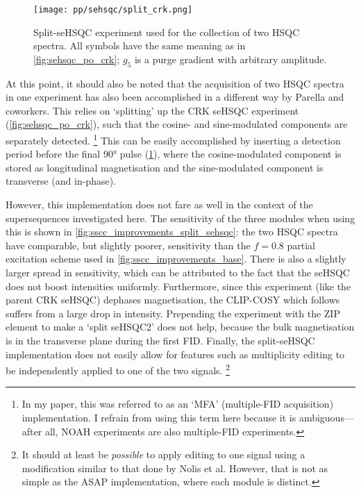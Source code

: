 \begin{figure}[!ht]
    \centering
    \texttt{[image: pp/sehsqc/split\_crk.png]}%
    \caption[Split-seHSQC experiment]{
        Split-seHSQC experiment used for the collection of two HSQC spectra.\autocite{Nolis2019CPC}
        All symbols have the same meaning as in \cref{fig:sehsqc_po_crk}; $g_5$ is a purge gradient with arbitrary amplitude.
    }
    \label{fig:split_crk}
\end{figure}

At this point, it should also be noted that the acquisition of two HSQC spectra in one experiment has also been accomplished in a different way by Parella and coworkers\autocite{Nolis2019CPC,Nolis2019JMR}.
This relies on `splitting' up the CRK seHSQC experiment (\cref{fig:sehsqc_po_crk}), such that the cosine- and sine-modulated components are separately detected.%
\footnote{In my paper\autocite{Yong2021JMR}, this was referred to as an `MFA' (multiple-FID acquisition) implementation. I refrain from using this term here because it is ambiguous---after all, NOAH experiments are also multiple-FID experiments.}
This can be easily accomplished by inserting a detection period before the final \proton{} \ang{90} pulse (\cref{fig:split_crk}), where the cosine-modulated component is stored as longitudinal magnetisation and the sine-modulated component is transverse (and in-phase).

However, this implementation does not fare as well in the context of the  supersequences investigated here.
The sensitivity of the three modules when using this is shown in \cref{fig:sscc_improvements_split_sehsqc}: the two HSQC spectra have comparable, but slightly poorer, sensitivity than the $f = 0.8$ partial excitation scheme used in \cref{fig:sscc_improvements_base}.
There is also a slightly larger spread in sensitivity, which can be attributed to the fact that the seHSQC does not boost intensities uniformly.
Furthermore, since this experiment (like the parent CRK seHSQC) dephases  magnetisation, the CLIP-COSY which follows suffers from a large drop in intensity.
Prepending the experiment with the ZIP element to make a `split seHSQC2' does not help, because the bulk magnetisation is in the transverse plane during the first FID.
Finally, the split-seHSQC implementation does not easily allow for features such as multiplicity editing to be independently applied to one of the two signals.%
\footnote{It should at least be \textit{possible} to apply editing to one signal using a modification similar to that done by Nolis et al.\autocite{Nolis2019JMR} However, that is not as simple as the ASAP implementation, where each module is distinct.}

